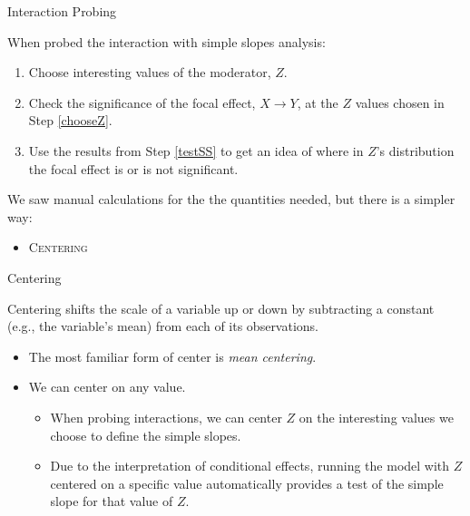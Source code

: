 \documentclass{beamer}\usepackage[]{graphicx}\usepackage[]{color}
\begin{document}

\begin{frame}{Interaction Probing}
  
  When probed the interaction with simple slopes analysis:
  \vb
  \begin{enumerate}
    \item Choose interesting values of the moderator, $Z$. \label{chooseZ}
      \vb
    \item Check the significance of the focal effect, $X \rightarrow Y$, at the 
      $Z$ values chosen in Step \ref{chooseZ}. \label{testSS}
      \vb
    \item Use the results from Step \ref{testSS} to get an idea of where in 
      $Z$'s distribution the focal effect is or is not significant.
  \end{enumerate}
  \va
  \pause
  We saw manual calculations for the the quantities needed, but there is a 
  simpler way:
  \vc
  \begin{itemize}
    \item \textsc{Centering}
  \end{itemize}
  
\end{frame}


\begin{frame}{Centering}
  
  Centering shifts the scale of a variable up or down by subtracting a constant 
  (e.g., the variable's mean) from each of its observations.
  \vc
  \begin{itemize}
  \item The most familiar form of center is \emph{mean centering}.
    \vc
  \item We can center on any value.
    \vc
    \begin{itemize}
    \item When probing interactions, we can center $Z$ on the interesting values
      we choose to define the simple slopes.
      \vc
    \item Due to the interpretation of conditional effects, running the model 
      with $Z$ centered on a specific value automatically provides a test of the 
      simple slope for that value of $Z$.
    \end{itemize}
  \end{itemize}
  
\end{frame}
\end{document}
